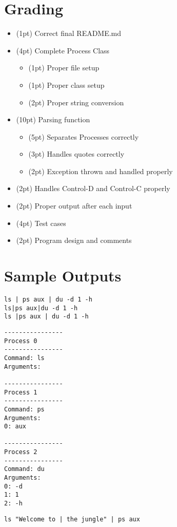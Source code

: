 \documentclass[12pt]{article}
\begin{document}
\section*{Grading}
\begin{itemize}
\item (1pt) Correct final README.md
\item (4pt) Complete Process Class
	\begin{itemize}
	\item (1pt) Proper file setup
	\item (1pt) Proper class setup
	\item (2pt) Proper string conversion
	\end{itemize}
\item (10pt) Parsing function
	\begin{itemize}
	\item (5pt) Separates Processes correctly
	\item (3pt) Handles quotes correctly
	\item (2pt) Exception thrown and handled properly 
	\end{itemize}
\item (2pt) Handles Control-D and Control-C properly
\item (2pt) Proper output after each input
\item (4pt) Test cases
\item (2pt) Program design and comments
\end{itemize}

\section*{Sample Outputs}

\begin{verbatim}
ls | ps aux | du -d 1 -h
ls|ps aux|du -d 1 -h
ls |ps aux | du -d 1 -h
\end{verbatim}

\begin{verbatim}
----------------
Process 0
----------------
Command: ls
Arguments:

----------------
Process 1
----------------
Command: ps
Arguments:
0: aux

----------------
Process 2
----------------
Command: du
Arguments:
0: -d
1: 1
2: -h
\end{verbatim}

\hrulefill

\begin{verbatim}
ls "Welcome to | the jungle" | ps aux
\end{verbatim}
\end{document}
